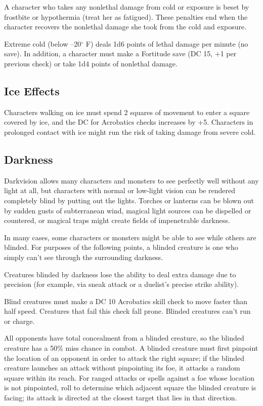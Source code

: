A character who takes any nonlethal damage from cold or exposure is beset by frostbite or hypothermia (treat her as fatigued). These penalties end when the character recovers the nonlethal damage she took from the cold and exposure.
				
Extreme cold (below --20\mbox{${}^\circ$} F) deals 1d6 points of lethal damage per minute (no save). In addition, a character must make a Fortitude save (DC 15, +1 per previous check) or take 1d4 points of nonlethal damage.
				
\subsection{Ice Effects}

				
Characters walking on ice must spend 2 squares of movement to enter a square covered by ice, and the DC for Acrobatics checks increases by +5. Characters in prolonged contact with ice might run the risk of taking damage from severe cold.
				
\subsection{Darkness}

				
Darkvision allows many characters and monsters to see perfectly well without any light at all, but characters with normal or low-light vision can be rendered completely blind by putting out the lights. Torches or lanterns can be blown out by sudden gusts of subterranean wind, magical light sources can be dispelled or countered, or magical traps might create fields of impenetrable darkness.
				
In many cases, some characters or monsters might be able to see while others are blinded. For purposes of the following points, a blinded creature is one who simply can't see through the surrounding darkness.
				
Creatures blinded by darkness lose the ability to deal extra damage due to precision (for example, via sneak attack or a duelist's precise strike ability).
				
Blind creatures must make a DC 10 Acrobatics skill check to move faster than half speed. Creatures that fail this check fall prone. Blinded creatures can't run or charge.
				
All opponents have total concealment from a blinded creature, so the blinded creature has a 50\% miss chance in combat. A blinded creature must first pinpoint the location of an opponent in order to attack the right square; if the blinded creature launches an attack without pinpointing its foe, it attacks a random square within its reach. For ranged attacks or spells against a foe whose location is not pinpointed, roll to determine which adjacent square the blinded creature is facing; its attack is directed at the closest target that lies in that direction.
				
